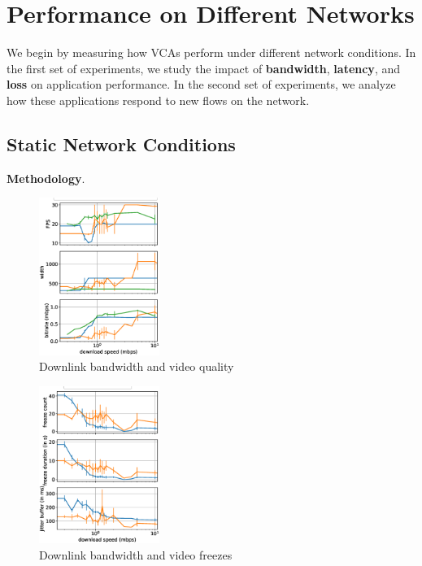 \section{Performance on Different Networks}\label{sec:methodology}
We begin by measuring how VCAs perform under different network conditions. 
In the first set of experiments, we study the impact of \textbf{bandwidth}, \textbf{latency}, 
and \textbf{loss} on application performance. In the second set of experiments, 
we analyze how these applications respond to new flows on the network.
\subsection{Static Network Conditions}


\noindent\textbf{Methodology}. 


\begin{figure}[]
    \includegraphics[width=0.35\textwidth,keepaspectratio]{../figures/static/downlink_qos_meet_teams_zoom.eps}
    \caption{Downlink bandwidth and video quality}
	\label{fig:downlink_video_qual}
\end{figure}


\begin{figure}[]
    \includegraphics[width=0.35\textwidth,keepaspectratio]{../figures/static/downlink_freeze_meet_teams.eps}
    \caption{Downlink bandwidth and video freezes}
    \label{fig:downlink_freeze}
\end{figure}


